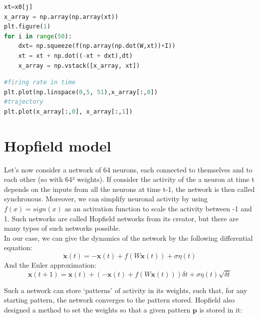 \documentclass{article}
\begin{document}
\begin{lstlisting}[language=Python, caption=System]
xt=x0[j]
x_array = np.array(np.array(xt))
plt.figure(1)
for i in range(50):
    dxt= np.squeeze(f(np.array(np.dot(W,xt))+I))
    xt = xt + np.dot((-xt + dxt),dt)
    x_array = np.vstack([x_array, xt])
\end{lstlisting}

\begin{lstlisting}[language=Python, caption=Plots]
#firing rate in time
plt.plot(np.linspace(0,5, 51),x_array[:,0])
#trajectory
plt.plot(x_array[:,0], x_array[:,1])
\end{lstlisting}


\section{Hopfield model}\label{hopfield}
\indent\indent Let's now consider a network of 64 neurons, each connected to themselves and to each other (so with 64² weights). If consider the activity of the a neuron at time t depends on the inputs from all the neurons at time t-1, the network is then called synchronous. Moreover, we can simplify neuronal activity by using $f(x)=sign(x)$ as an activation function to scale the activity between -1 and 1. Such networks are called Hopfield networks from its creator, but there are many types of such networks possible.\\
\indent In our case, we can give the dynamics of the network by the following differential equation:
\begin{equation}\label{eq:7}
    \dot{\mathbf{x}}(t) = -\mathbf{x}(t) + f(W \mathbf{x}(t)) + \sigma \eta(t)
\end{equation}
\indent And the Euler approximation:
\begin{equation}\label{eq:8}
  \mathbf{x}(t+1) = \mathbf{x}(t) + (-\mathbf{x}(t) + f(W\mathbf{x}(t)))\delta t + \sigma \eta(t) \sqrt{\delta t}
\end{equation}

Such a network can store `patterns' of activity in its weights, such that, for any starting pattern, the network converges to the pattern stored. Hopfield also designed a method to set the weights so that a given pattern $\mathbf{p}$ is stored in it:
\end{document}

